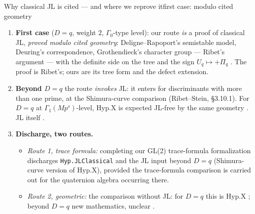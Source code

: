 \begin{frame}{Why classical JL is cited --- and where we reprove it}{first case: modulo cited geometry}
  \small
  \begin{enumerate}\setlength{\itemsep}{1pt}
    \item \textbf{First case} ($D=q$, weight $2$, $\Gamma_0$-type level): our route \emph{is} a proof of classical JL,
      \emph{proved modulo cited geometry}: Deligne--Rapoport's semistable model, Deuring's correspondence, Grothendieck's
      character group --- Ribet's argument --- with the definite side on the tree  and the sign
      $U_q\mapsto+\Pi_q$ . The proof is Ribet's; ours are its tree form and the defect extension.
    \item \textbf{Beyond $D=q$} the route \emph{invokes} JL: it enters for discriminants with more than one prime, at the
      Shimura-curve comparison (Ribet--Stein, \S3.10.1). For $D=q$ at $\Gamma_1(Mp^s)$-level, $\mathrm{Hyp.X}$ is expected JL-free by the
      same geometry . JL itself .
    \item \textbf{Discharge, two routes.}
      \begin{itemize}\setlength{\itemsep}{1pt}
        \item \emph{Route 1, trace formula:} completing our GL(2) trace-formula formalization discharges \texttt{Hyp.JLClassical} and the
          JL input beyond $D=q$ (Shimura-curve version of $\mathrm{Hyp.X}$), provided the trace-formula comparison is carried out
          for the quaternion algebra occurring there. 
        \item \emph{Route 2, geometric:} the comparison without JL: for $D=q$ this is $\mathrm{Hyp.X}$ ; beyond $D=q$
          new mathematics, unclear .
      \end{itemize}
  \end{enumerate}
\end{frame}
